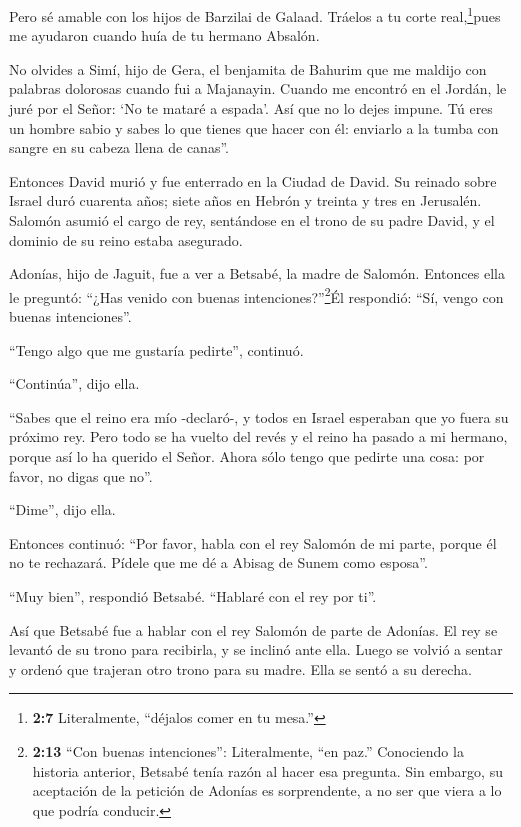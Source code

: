  Pero sé amable con los hijos de Barzilai de Galaad. Tráelos
a tu corte real,\footnote{\textbf{2:7} Literalmente, ``déjalos comer en
  tu mesa.''}pues me ayudaron cuando huía de tu hermano Absalón.

 No olvides a Simí, hijo de Gera, el benjamita de Bahurim
que me maldijo con palabras dolorosas cuando fui a Majanayin. Cuando me
encontró en el Jordán, le juré por el Señor: `No te mataré a espada'.
 Así que no lo dejes impune. Tú eres un hombre sabio y sabes
lo que tienes que hacer con él: enviarlo a la tumba con sangre en su
cabeza llena de canas''.

 Entonces David murió y fue enterrado en la Ciudad de
David.  Su reinado sobre Israel duró cuarenta años; siete
años en Hebrón y treinta y tres en Jerusalén.  Salomón
asumió el cargo de rey, sentándose en el trono de su padre David, y el
dominio de su reino estaba asegurado.

 Adonías, hijo de Jaguit, fue a ver a Betsabé, la madre de
Salomón. Entonces ella le preguntó: ``¿Has venido con buenas
intenciones?''\footnote{\textbf{2:13} ``Con buenas intenciones'':
  Literalmente, ``en paz.'' Conociendo la historia anterior, Betsabé
  tenía razón al hacer esa pregunta. Sin embargo, su aceptación de la
  petición de Adonías es sorprendente, a no ser que viera a lo que
  podría conducir.}Él respondió: ``Sí, vengo con buenas intenciones''.

 ``Tengo algo que me gustaría pedirte'', continuó.

``Continúa'', dijo ella.

 ``Sabes que el reino era mío -declaró-, y todos en Israel
esperaban que yo fuera su próximo rey. Pero todo se ha vuelto del revés
y el reino ha pasado a mi hermano, porque así lo ha querido el Señor.
 Ahora sólo tengo que pedirte una cosa: por favor, no digas
que no''.

``Dime'', dijo ella.

 Entonces continuó: ``Por favor, habla con el rey Salomón
de mi parte, porque él no te rechazará. Pídele que me dé a Abisag de
Sunem como esposa''.

 ``Muy bien'', respondió Betsabé. ``Hablaré con el rey por
ti''.

 Así que Betsabé fue a hablar con el rey Salomón de parte
de Adonías. El rey se levantó de su trono para recibirla, y se inclinó
ante ella. Luego se volvió a sentar y ordenó que trajeran otro trono
para su madre. Ella se sentó a su derecha.

